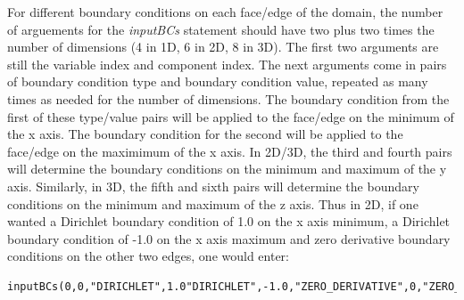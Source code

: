 \documentclass[10pt]{article} %
\begin{document}
For different boundary conditions on each face/edge of the domain, the number of arguements for the \emph{inputBCs} statement should have two plus two times the number of dimensions (4 in 1D, 6 in 2D, 8 in 3D). The first two arguments are still the variable index and component index. The next arguments come in pairs of boundary condition type and boundary condition value, repeated as many times as needed for the number of dimensions. The boundary condition from the first of these type/value pairs will be applied to the face/edge on the minimum of the x axis. The boundary condition for the second will be applied to the  face/edge on the maximimum of the x axis. In 2D/3D, the third and fourth pairs will determine the boundary conditions on the minimum and maximum of the y axis. Similarly, in 3D, the fifth and sixth pairs will determine the boundary conditions on the minimum and maximum of the z axis. Thus in 2D, if one wanted a Dirichlet boundary condition of 1.0 on the x axis minimum, a Dirichlet boundary condition of -1.0 on the x axis maximum and zero derivative boundary conditions on the other two edges, one would enter:
\tiny
\begin{lstlisting} 
inputBCs(0,0,"DIRICHLET",1.0"DIRICHLET",-1.0,"ZERO_DERIVATIVE",0,"ZERO_DERIVATIVE",0);
\end{lstlisting} \normalsize
\end{document}
